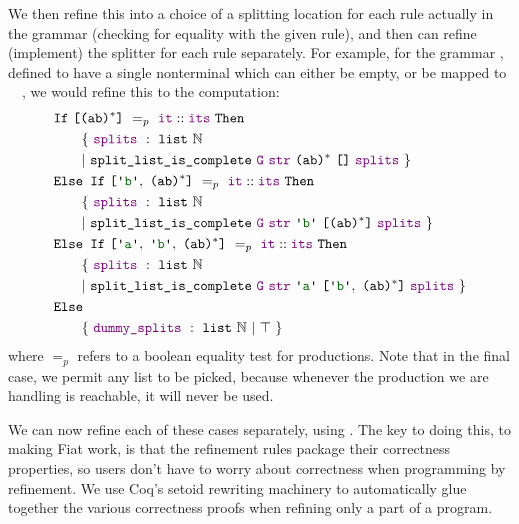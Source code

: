     We then refine this into a choice of a splitting location for each rule actually in the grammar (checking for equality with the given rule), and then can refine (implement) the splitter for each rule separately.  For example, for the grammar , defined to have a single nonterminal  which can either be empty, or be mapped to ~~, we would refine this to the computation:\label{sec:if-folding}
\newcommand{\ndcompfor}[3][]{%
#1\{~\farg{splits}~:~\indname{list}~{\mathbb{N}} \\
&\phantom{#1} |~\fname{split\_list\_is\_complete}~\farg{G}~\farg{str}~#2~#3~\farg{splits}~\}
}
\begin{align*}
& \fname{If}~\valuelist{\nt{(ab)\ensuremath{^*}}}~=_p~\cons{\farg{it}}{\farg{its}}~\fname{Then} \\
&\ndcompfor[\qquad]{\nt{(ab)\ensuremath{^*}}}{\nil} \\
& \fname{Else~If}~\valuelist{\terminal{b},~\nt{(ab)\ensuremath{^*}}}~=_p~\cons{\farg{it}}{\farg{its}}~\fname{Then} \\
&\ndcompfor[\qquad]{\terminal{b}}{\valuelist{\nt{(ab)\ensuremath{^*}}}} \\
& \fname{Else~If}~\valuelist{\terminal{a},~\terminal{b},~\nt{(ab)\ensuremath{^*}}}~=_p~\cons{\farg{it}}{\farg{its}}~\fname{Then} \\
&\ndcompfor[\qquad]{\terminal{a}}{\valuelist{\terminal{b},~\nt{(ab)\ensuremath{^*}}}} \\
& \fname{Else} \\
&\qquad\{~\farg{dummy\_splits}~:~\indname{list}~\mathbb{N}~|~\True~\} \\
\end{align*}
       where $=_p$ refers to a boolean equality test for productions.  Note that in the final case, we permit any list to be picked, because whenever the production we are handling is reachable, it will never be used.
    
       We can now refine each of these cases separately, using .  
       The key to doing this, to making Fiat work, is that the refinement rules package their correctness properties, so users don't have to worry about correctness when programming by refinement.  We use Coq's setoid rewriting machinery to automatically glue together the various correctness proofs when refining only a part of a program.
           

